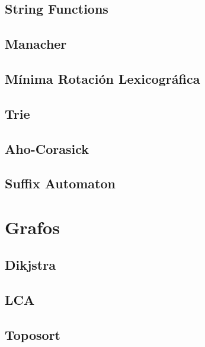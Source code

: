 \documentclass[a4paper,10pt,twocolumn]{article}
\begin{document}
\subsection{String Functions}

%
\subsection{Manacher}

\subsection{Mínima Rotación Lexicográfica}

\subsection{Trie}

\subsection{Aho-Corasick}

\subsection{Suffix Automaton}


\section{Grafos} %
\subsection{Dikjstra}

\subsection{LCA}

% 
\subsection{Toposort}

\end{document}
